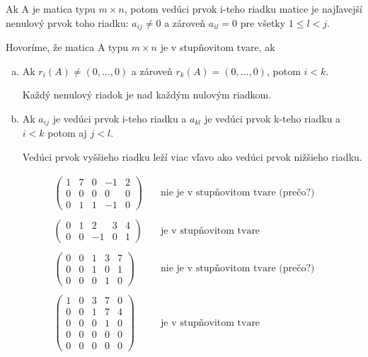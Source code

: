 \begin{definition}\label{def:veduciPrvok}
Ak A je matica typu $m \times n$, potom vedúci prvok i-teho riadku matice je
najľavejší nenulový prvok toho riadku: $a_{ij} \ne 0$ a zároveň $a_{il} = 0$ pre
všetky $1 \le l < j$.
\end{definition}

\begin{definition}
Hovoríme, že matica A typu $m \times n$ je v stupňovitom tvare, ak
\begin{enumerate}[(a)]
    \item Ak $r_i(A) \ne (0, \dots, 0)$ a zároveň $r_k(A) = (0, \dots, 0)$, potom $i < k$. 
    \begin{framed}
    Každý nenulový riadok je nad každým nulovým riadkom.
    \end{framed}
    \item Ak $a_{ij}$ je vedúci prvok i-teho riadku a $a_{kl}$ je vedúci prvok k-teho
    riadku a $i<k$ potom aj $j<l$. 
    \begin{framed}
    Vedúci prvok vyššieho riadku leží viac vľavo ako
    vedúci prvok nižšieho riadku.
    \end{framed}
\end{enumerate}
\end{definition}
\begin{example}
\[
\begin{array}{rl}
\begin{pmatrix} 1 & 7 & 0 & -1 & 2 \\ 0 & 0 & 0 & 0 & 0 \\ 0 & 1 & 1 & -1 & 0
\end{pmatrix} & 
\quad \text{nie je v stupňovitom tvare (prečo?)} \\~\\
\begin{pmatrix} 0 & 1 & 2 & 3 & 4 \\ 0 & 0 & -1 & 0 & 1 
\end{pmatrix} &
\quad\text{je v stupňovitom tvare}\\~\\
\begin{pmatrix} 0 & 0 & 1 & 3 & 7 \\ 0 & 0 & 1 & 0 & 1 \\ 0 & 0 & 0 & 1 & 0
\end{pmatrix} &
\quad \text{nie je v stupňovitom tvare (prečo?)} \\~\\
\begin{pmatrix} 1 & 0 & 3 & 7 & 0 \\ 0 & 0 & 1 & 7 & 4 \\ 0 & 0 & 0 & 1 & 0 \\ 0 & 0 & 0 & 0 & 0 \\ 0 & 0 & 0 & 0 & 0 
\end{pmatrix} &
\quad\text{je v stupňovitom tvare}
\end{array}
\]
\end{example}
